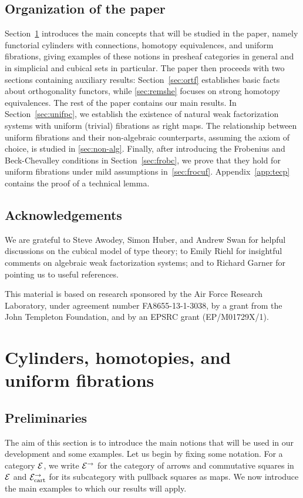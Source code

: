 \documentclass[reqno,10pt,a4paper,oneside,draft]{amsart}
\begin{document}
\subsection*{Organization of the paper}
Section~\ref{sec:cylhuf} introduces the main concepts that will be studied in the paper, namely functorial cylinders with connections, homotopy equivalences, and uniform fibrations, giving examples of these notions in presheaf categories in general and in simplicial and cubical sets in particular.
The paper then proceeds with two sections containing auxiliary results: Section~\ref{sec:ortf} establishes basic facts about orthogonality functors, while \cref{sec:remshe} focuses on strong homotopy equivalences.
The rest of the paper contains our main results.
In Section~\ref{sec:unifpc}, we establish the existence of natural weak factorization systems with uniform (trivial) fibrations as right maps.
The relationship between uniform fibrations and their non-algebraic counterparts, assuming the axiom of choice, is studied in \cref{sec:non-alg}.
Finally, after introducing the Frobenius and Beck-Chevalley conditions in Section~\ref{sec:frobc}, we prove that they hold for uniform fibrations under mild assumptions in~\cref{sec:frocuf}.
Appendix~\ref{app:tecp} contains the proof of a technical lemma.

\subsection*{Acknowledgements}
We are grateful to Steve Awodey, Simon Huber, and Andrew Swan for helpful discussions on the cubical model of type theory; to Emily Riehl for insightful comments on algebraic weak factorization systems; and to Richard Garner for pointing us to useful references.

This material is based on research sponsored by the Air Force Research Laboratory, under agreement number FA8655-13-1-3038, by a grant from the John Templeton Foundation, and by an EPSRC grant (EP/M01729X/1).


\section{Cylinders, homotopies, and uniform fibrations}
\label{sec:cylhuf}

\subsection*{Preliminaries}

The aim of this section is to introduce the main notions that will be used in our development and some examples.
Let us begin by fixing some notation.
For a category $\cal{E}$, we write $\cal{E}^\to$ for the category of arrows and commutative squares in $\cal{E}$ and $\cal{E}^\to_{\cart}$ for its subcategory with pullback squares as maps.
We now introduce the main examples to which our results will apply.
\end{document}
